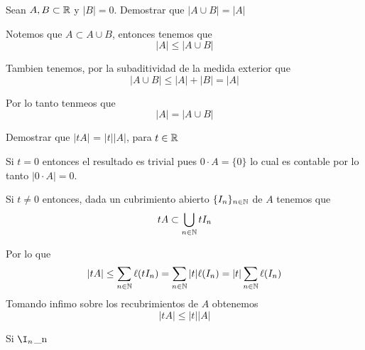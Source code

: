 \documentclass[../main.tex]{subfiles}
\begin{document}
\begin{problem}
Sean $A, B \subset \mathbb{R}$ y $|B| = 0$. Demostrar que $|A \cup B| = |A|$
\end{problem}
\begin{solution}
  Notemos que $A \subset A \cup B$, entonces tenemos que
  \begin{equation*}
    |A| \leq |A \cup B|
  \end{equation*}

  Tambien tenemos, por la subaditividad de la medida exterior que
  \begin{equation*}
    |A \cup B| \leq |A| + |B| = |A|
  \end{equation*}

  Por lo tanto tenmeos que
  \begin{equation*}
    |A| = |A \cup B|
  \end{equation*}
\end{solution}

\begin{problem}
Demostrar que $|tA|$ = $|t||A|$, para $t \in \mathbb{R}$
\end{problem}
\begin{solution}
  Si $t = 0$ entonces el resultado es trivial pues $0 \cdot A = \{0\}$ lo cual es contable por lo tanto $|0 \cdot A| = 0$.

  Si $t \neq 0$ entonces, dada un cubrimiento abierto $\{I_{n}\}_{n \in \mathbb{N}}$ de $A$ tenemos que
  \begin{equation*}
    tA \subset \bigcup_{n \in \mathbb{N}} tI_{n}
  \end{equation*}

  Por lo que
  \begin{equation*}
    |tA| \leq \sum_{n \in \mathbb{N}} \ell(tI_{n}) = \sum_{n \in \mathbb{N}} |t|\ell(I_{n}) =|t| \sum_{n \in \mathbb{N}}\ell(I_{n})
  \end{equation*}
  Tomando infimo sobre los recubrimientos de $A$ obtenemos
  \begin{equation*}
    |tA| \leq |t||A|
  \end{equation*}

  Si  $\I_{n}$_{n \in \N}
\end{solution}
\end{document}
